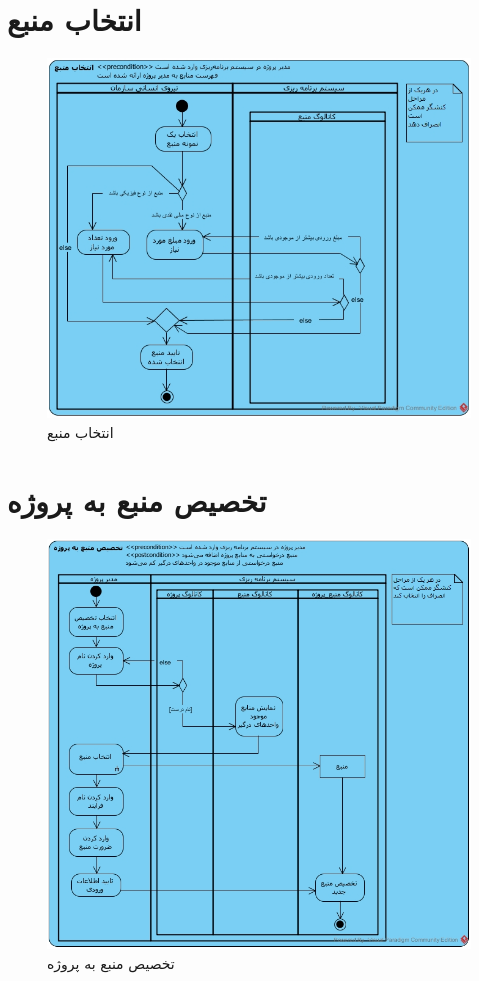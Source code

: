\section{انتخاب منبع}
\begin{figure}[H]
	\centering
	\includegraphics[scale=0.7]{img/activity/ResourceSelection}
	\caption{انتخاب منبع}
\end{figure}


\section{تخصیص منبع به پروژه}
\begin{figure}[H]
	\centering
	\includegraphics[scale=0.65]{img/activity/AllocateResourceToProject}
	\caption{تخصیص منبع به پروژه}
\end{figure}

